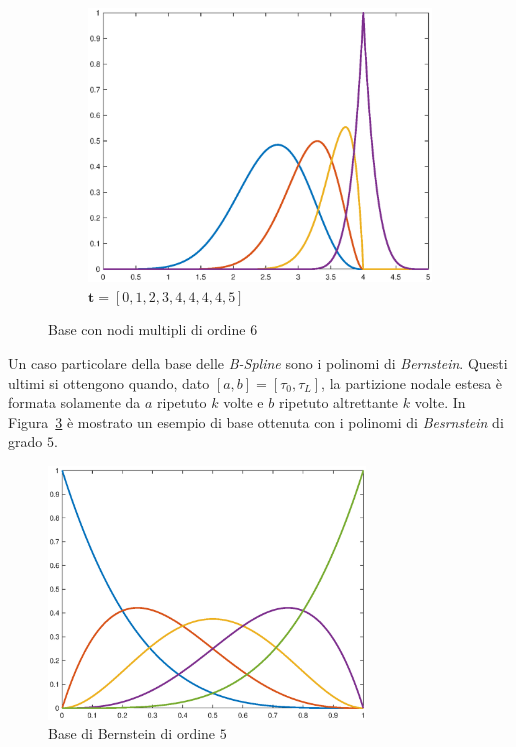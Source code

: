 \documentclass[a4paper, 12pt]{article}
\begin{document}
\begin{figure}[]
\begin{subfigure}[b]{0.3\textwidth}
  \end{subfigure}
  \begin{subfigure}[b]{0.3\textwidth}
    \includegraphics[width=\textwidth]{figure/6_45.eps}
    \caption{$\mathbf{t} = [0, 1, 2, 3, 4, 4, 4, 4, 5]$}
    \label{fig:645}
  \end{subfigure}
  \caption{Base con nodi multipli di ordine 6}\label{fig:animals}
\end{figure}

Un caso particolare della base delle \textit{B-Spline} sono i polinomi di \textit{Bernstein}. Questi ultimi si ottengono quando, 
dato $[a, b] = [\tau_0, \tau_L]$, la partizione nodale estesa è formata solamente da $a$ ripetuto $k$ volte
e $b$ ripetuto altrettante $k$ volte. In Figura~\ref{fig:bernstein} è mostrato un esempio di base ottenuta con 
i polinomi di \textit{Besrnstein} di grado $5$.

\begin{figure}[]
  \centering
  \includegraphics[width=0.75\textwidth]{figure/bernstein5_from_cox_de_boor.eps}
  \caption{Base di Bernstein di ordine $5$}
  \label{fig:bernstein}
\end{figure} 
\end{document}
